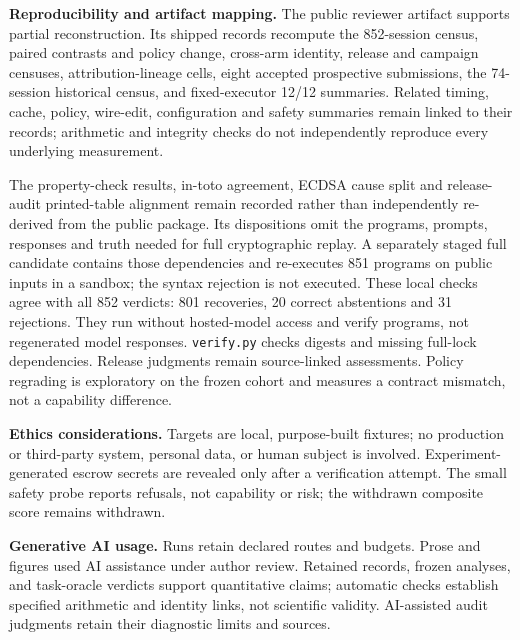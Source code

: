 \textbf{Reproducibility and artifact mapping.} The public reviewer artifact
supports partial reconstruction. Its shipped records recompute the 852-session
census, paired contrasts and policy change, cross-arm identity, release and
campaign censuses, attribution-lineage cells, eight accepted prospective
submissions, the 74-session historical census, and fixed-executor 12/12
summaries. Related timing, cache, policy, wire-edit, configuration and safety
summaries remain linked to their records; arithmetic and integrity checks
do not independently reproduce every underlying measurement.

The property-check results, in-toto agreement, ECDSA cause split and
release-audit printed-table alignment remain recorded rather than
independently re-derived from the public package. Its dispositions omit the
programs, prompts, responses and truth needed for full cryptographic replay.
A separately staged full candidate contains those dependencies and re-executes
851 programs on public inputs in a sandbox; the syntax rejection is not
executed. These local checks agree with all 852 verdicts: 801 recoveries,
20 correct abstentions and 31 rejections. They run without hosted-model access
and verify programs, not regenerated model responses.
\texttt{verify.py} checks digests and missing full-lock dependencies.
Release judgments remain source-linked assessments. Policy regrading is
exploratory on the frozen cohort and measures a contract mismatch, not a
capability difference.

\textbf{Ethics considerations.} Targets are local, purpose-built fixtures;
no production or third-party system, personal data, or human subject is
involved. Experiment-generated escrow secrets are revealed only after a
verification attempt. The small safety probe reports refusals, not capability or
risk; the withdrawn composite score remains withdrawn.

\textbf{Generative AI usage.} Runs retain declared routes and budgets.
Prose and figures used AI assistance under author review. Retained records,
frozen analyses, and task-oracle verdicts support quantitative claims;
automatic checks establish specified arithmetic and identity links, not
scientific validity. AI-assisted audit judgments retain their diagnostic
limits and sources.
